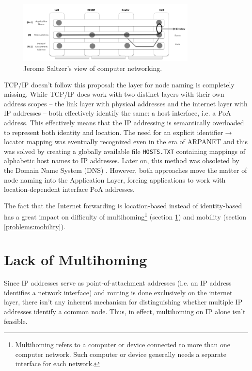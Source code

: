         \begin{figure}[H]
            \begin{center}
                \includegraphics[width=0.8\textwidth]{fig/problems_saltzer.png}
              \caption{Jerome Saltzer's view of computer networking.}
              \label{fig:saltzer}
            \end{center}
        \end{figure}

        TCP/IP doesn't follow this proposal: the layer for node naming is completely missing. While TCP/IP does work with two distinct layers with their own address scopes -- the link layer with physical addresses and the internet layer with IP addresses -- both effectively identify the same: a host interface, i.e. a PoA address. This effectively means that the IP addressing is semantically overloaded to represent both identity and location. The need for an explicit identifier$\rightarrow$locator mapping was eventually recognized even in the era of ARPANET and this was solved by creating a globally available file \texttt{HOSTS.TXT} containing mappings of alphabetic host names to IP addresses. Later on, this method was obsoleted by the Domain Name System (DNS) \cite{rfc1034}. However, both approaches move the matter of node naming into the Application Layer, forcing applications to work with location-dependent interface PoA addresses.

        The fact that the Internet forwarding is location-based instead of identity-based has a great impact on difficulty of multihoming\footnote{Multihoming refers to a computer or device connected to more than one computer network. Such computer or device generally needs a separate interface for each network.} (section \ref{problems:multihoming}) and mobility (section \ref{problems:mobility}).

    \section{Lack of Multihoming}\label{problems:multihoming}

        Since IP addresses serve as point-of-attachment addresses (i.e. an IP address identifies a network interface) and routing is done exclusively on the internet layer, there isn't any inherent mechanism for distinguishing whether multiple IP addresses identify a common node. Thus, in effect, multihoming on IP alone isn't feasible.

